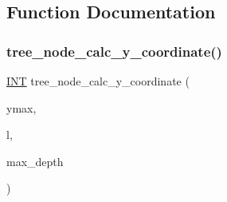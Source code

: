 \subsection{Function Documentation}
\mbox{\label{tree__node_8_c_a90fd31502ff6159142ddb0a966be9015}} 
\subsubsection{\texorpdfstring{tree\+\_\+node\+\_\+calc\+\_\+y\+\_\+coordinate()}{tree\_node\_calc\_y\_coordinate()}}
{\footnotesize\ttfamily \mbox{\hyperlink{galois_8h_a09fddde158a3a20bd2dcadb609de11dc}{I\+NT}} tree\+\_\+node\+\_\+calc\+\_\+y\+\_\+coordinate (\begin{DoxyParamCaption}\item[{\mbox{\hyperlink{galois_8h_a09fddde158a3a20bd2dcadb609de11dc}{I\+NT}}}]{ymax,  }\item[{\mbox{\hyperlink{galois_8h_a09fddde158a3a20bd2dcadb609de11dc}{I\+NT}}}]{l,  }\item[{\mbox{\hyperlink{galois_8h_a09fddde158a3a20bd2dcadb609de11dc}{I\+NT}}}]{max\+\_\+depth }\end{DoxyParamCaption})}

